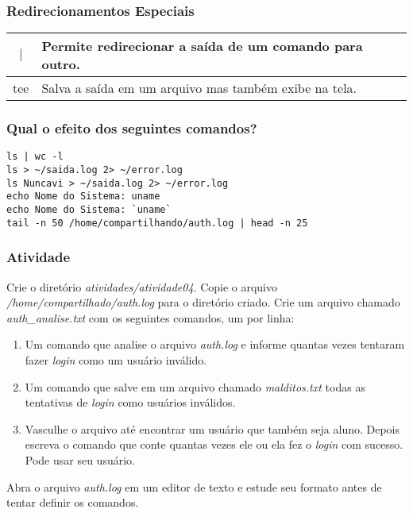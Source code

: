 \documentclass{beamer}
\begin{document}
  \begin{frame}
      \frametitle{Redirecionamentos Especiais}
      \begin{table}
         \begin{tabular}{ c | l }
         $|$ & Permite redirecionar a saída de um comando para outro. \\
         \hline 
         tee & Salva a saída em um arquivo mas também exibe na tela. \\
         \hline 
         \end{tabular}
      \end{table}
   \end{frame}

   \begin{frame}[fragile]
      \frametitle{Qual o efeito dos seguintes comandos?}
      \begin{verbatim}
ls | wc -l 
ls > ~/saida.log 2> ~/error.log 
ls Nuncavi > ~/saida.log 2> ~/error.log
echo Nome do Sistema: uname  
echo Nome do Sistema: `uname`
tail -n 50 /home/compartilhando/auth.log | head -n 25  
       \end{verbatim}
\end{frame}

   \begin{frame}
      \frametitle{Atividade}
      Crie o diretório \textit{atividades/atividade04}. Copie o arquivo \textit{/home/compartilhado/auth.log} para o diretório criado. Crie um arquivo chamado \textit{auth\_analise.txt} com os seguintes comandos, um por linha:
      \begin{enumerate}
         \item Um comando que analise o arquivo \textit{auth.log} e informe quantas vezes tentaram fazer \textit{login} como um usuário inválido.
	 \item Um comando que salve em um arquivo chamado \textit{malditos.txt} todas as tentativas de \textit{login} como usuários inválidos.
	 \item Vasculhe o arquivo até encontrar um usuário que também seja aluno. Depois escreva o comando que conte quantas vezes ele ou ela fez o \textit{login} com sucesso. Pode usar seu usuário. 
      \end{enumerate}
      Abra o arquivo \textit{auth.log} em um editor de texto e estude seu formato antes de tentar definir os comandos.
   \end{frame}

\end{document}
